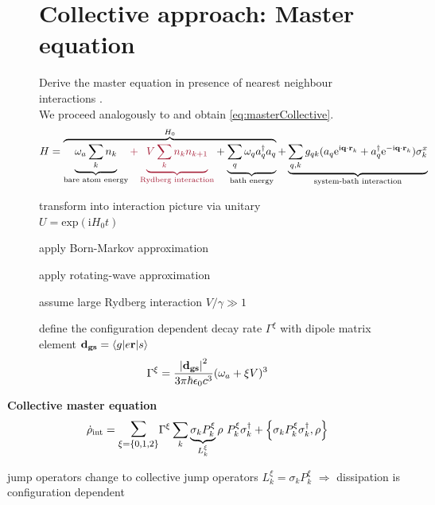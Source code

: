 \documentclass[a0,plainsections]{sciposter}
\renewcommand{\i}{\mathrm{i}} %
\newcommand{\e}{\mathrm{e}} %
\newcommand{\ut}[2]{\underbrace{#1}_{\substack{\text{#2}}}}%
\newcommand{\ot}[2]{\overbrace{#1}^{\substack{\text{#2}}}}
\begin{document}
\begin{multicols}{2}
\begin{figure}
		\section{Collective approach: Master equation}
		Derive the master equation in presence of nearest neighbour interactions \cite{Gonzalez2017}.\\
		We proceed analogously to \cite{Breuer_2007,lidar2020lecture,Schaller2015} and obtain \eqref{eq:masterCollective}.
		\begin{align}
			H & =
			\ot{
			\ut{\omega_a\sum_k{n_k}}{bare atom energy}
			\textcolor{rot}{+\ut{V \sum_k{n_kn_{k+1}}}{Rydberg interaction}}
			+\ut{\sum_q{\omega_q a_{q}^\dagger a_q}}{bath energy}
			}{$H_0$}
			+\ut{\sum_{q,k}{g_{qk}(a_q \e^{\i \vb{q \cdot r}_k}+a_{q}^\dagger\e^{-\i \vb{q \cdot r}_k})\sigma_k^x}}{system-bath interaction}
			\label{eq:HamiltonMitBad}
		\end{align}
	\end{figure}
	\addtocounter{figure}{-2}
	\begin{figure}
		\begin{AutoMultiColEnumerate}
			\item transform into interaction picture via unitary\\ $U=\text{exp}(\i H_0 t)$
			\item apply Born-Markov approximation
			\item apply rotating-wave approximation
			\item assume large Rydberg interaction $V/\gamma\gg 1$
			\item define the configuration dependent decay rate $\Gamma^\xi$ with dipole matrix element $\vb{d_{gs}}=\mel**{g}{e\vb{r}}{s}$
			\begin{equation}
				\Gamma^\xi =
				\frac{\abs{\vb{d_{gs}}}^2}{3 \pi \hbar \epsilon_0 c^3}
				(\omega_a+\xi V)^3
				\label{eq:GammaXi}
			\end{equation}
		\end{AutoMultiColEnumerate}
	\end{figure}
	\begin{shaded}
		\textbf{Collective master equation}
		\begin{equation}
			\dot\rho_\text{int}  = \mathlarger{\mathlarger{\sum}}_{\xi=\left\{ 0,1,2 \right\}}
			\Gamma^\xi
			\sum_k \ut{\sigma_k P_k^\xi}{$L_k^\xi$} \rho\ P_k^\xi \sigma_k^\dagger
			+ \acomm{ \sigma_k P_k^\xi \sigma_k^\dagger}{\rho}
			\label{eq:masterCollective}
		\end{equation}
		\begin{AutoMultiColItemize}
			\renewcommand\labelitemi{\textcolor{rot}{$\rightarrow$}}
			\item jump operators change to collective jump operators $L_k^\xi=\sigma_k P_k^\xi$
			$\Rightarrow$ dissipation is configuration dependent
		\end{AutoMultiColItemize}
	\end{shaded}



\end{multicols}
\end{document}
